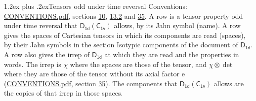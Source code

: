 \documentclass[10pt,a4paper]{article}
\makeatletter
\renewcommand\section{\@startsection{section}{1}{\z@}{-3ex plus -1ex minus -.2ex}%
  {1.2ex plus .2ex}{\normalfont\large\sffamily\bfseries\color{parttitle}}}
\numberwithin{equation}{section}
\newcommand{\grp}[1]{\mathsf{#1}}
\newcommand{\irrprod}{\otimes}
\makeatother
\begin{document}
\section{Tensors odd under time reversal}\label{s:time_odd}
Conventions: \href{../../CONVENTIONS.pdf}{CONVENTIONS.pdf}, sections \href{../../../rotation/CONVENTIONS.pdf\#conv.10}{10}, \href{../../../rotation/CONVENTIONS.pdf\#conv.13.2}{13.2} and \href{../../CONVENTIONS.pdf\#conv.35}{35}.
\leavevmode\label{n:head.name.property}A row is a tensor property odd under time reversal that $\grp{D_{1d}}(\grp{C_{1v}})$ allows, by its Jahn symbol (name). \label{n:head.spaces}A row gives the spaces of Cartesian tensors in which its components are read (spaces), by their Jahn symbols in the section Isotypic components of the document of \href{../../../rotation/data/pdf/D1d.pdf}{$\grp{D_{1d}}$}. \label{n:head.properties}A row also gives the irrep of $\grp{D_{1d}}$ at which they are read and the properties in words. The irrep is $\chi$ where the spaces are those of the tensor, and $\chi \irrprod \det$ where they are those of the tensor without its axial factor e (\href{../../CONVENTIONS.pdf}{CONVENTIONS.pdf}, section \href{../../CONVENTIONS.pdf\#conv.35}{35}). The components that $\grp{D_{1d}}(\grp{C_{1v}})$ allows are the copies of that irrep in those spaces.
\end{document}
